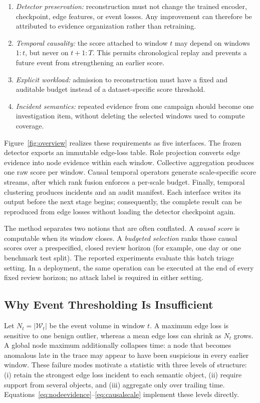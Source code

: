 \documentclass[lettersize,journal]{IEEEtran}
\begin{document}
\begin{enumerate}
  \item \emph{Detector preservation:} reconstruction must not change the
  trained encoder, checkpoint, edge features, or event losses.  Any improvement
  can therefore be attributed to evidence organization rather than retraining.
  \item \emph{Temporal causality:} the score attached to window $t$ may depend
  on windows $1{:}t$, but never on $t{+}1{:}T$.  This permits chronological
  replay and prevents a future event from strengthening an earlier score.
  \item \emph{Explicit workload:} admission to reconstruction must have a fixed
  and auditable budget instead of a dataset-specific score threshold.
  \item \emph{Incident semantics:} repeated evidence from one campaign should
  become one investigation item, without deleting the selected windows used to
  compute coverage.
\end{enumerate}

Figure~\ref{fig:overview} realizes these requirements as five interfaces.  The
frozen detector exports an immutable edge-loss table.  Role projection converts
edge evidence into node evidence within each window.  Collective aggregation
produces one raw score per window.  Causal temporal operators generate
scale-specific score streams, after which rank fusion enforces a per-scale
budget.  Finally, temporal clustering produces incidents and an audit manifest.
Each interface writes its output before the next stage begins; consequently,
the complete result can be reproduced from edge losses without loading the
detector checkpoint again.

The method separates two notions that are often conflated.  A \emph{causal
score} is computable when its window closes.  A \emph{budgeted selection} ranks
those causal scores over a prespecified, closed review horizon (for example, one
day or one benchmark test split).  The reported experiments evaluate this batch
triage setting.  In a deployment, the same operation can be executed at the end
of every fixed review horizon; no attack label is required in either setting.

\subsection{Why Event Thresholding Is Insufficient}

Let $N_t=|\mathcal W_t|$ be the event volume in window $t$.  A maximum edge loss
is sensitive to one benign outlier, whereas a mean edge loss can shrink as
$N_t$ grows.  A global node maximum additionally collapses time: a node that
becomes anomalous late in the trace may appear to have been suspicious in every
earlier window.  These failure modes motivate a statistic with three levels of
structure: (i) retain the strongest edge loss incident to each semantic object,
(ii) require support from several objects, and (iii) aggregate only over trailing
time.  Equations~\eqref{eq:nodeevidence}--\eqref{eq:causalscale} implement these
levels directly.
\end{document}
